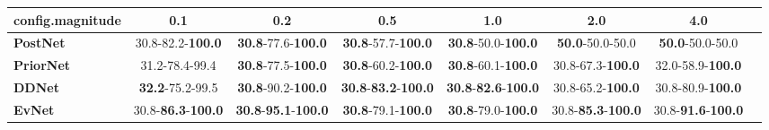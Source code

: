 \begin{tabular}{lccccccc}
\toprule
\textbf{config.magnitude} &                                0.1 &                                         0.2 &                                         0.5 &                                         1.0 &                                2.0 &                                4.0 \\
\midrule
\textbf{PostNet } &           30.8-82.2-\textbf{100.0} &           \textbf{30.8}-77.6-\textbf{100.0} &           \textbf{30.8}-57.7-\textbf{100.0} &           \textbf{30.8}-50.0-\textbf{100.0} &            \textbf{50.0}-50.0-50.0 &            \textbf{50.0}-50.0-50.0 \\
\textbf{PriorNet} &                     31.2-78.4-99.4 &           \textbf{30.8}-77.5-\textbf{100.0} &           \textbf{30.8}-60.2-\textbf{100.0} &           \textbf{30.8}-60.1-\textbf{100.0} &           30.8-67.3-\textbf{100.0} &           32.0-58.9-\textbf{100.0} \\
\textbf{DDNet   } &            \textbf{32.2}-75.2-99.5 &           \textbf{30.8}-90.2-\textbf{100.0} &  \textbf{30.8}-\textbf{83.2}-\textbf{100.0} &  \textbf{30.8}-\textbf{82.6}-\textbf{100.0} &           30.8-65.2-\textbf{100.0} &           30.8-80.9-\textbf{100.0} \\
\textbf{EvNet   } &  30.8-\textbf{86.3}-\textbf{100.0} &  \textbf{30.8}-\textbf{95.1}-\textbf{100.0} &           \textbf{30.8}-79.1-\textbf{100.0} &           \textbf{30.8}-79.0-\textbf{100.0} &  30.8-\textbf{85.3}-\textbf{100.0} &  30.8-\textbf{91.6}-\textbf{100.0} \\
\bottomrule
\end{tabular}
